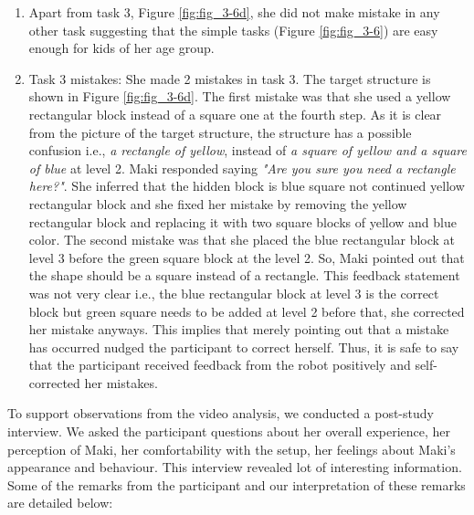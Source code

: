\begin{enumerate}
    \item Apart from task 3, Figure \ref{fig:fig_3-6d}, she did not make mistake in any other task suggesting that the simple tasks (Figure \ref{fig:fig_3-6}) are easy enough for kids of her age group.
    \item Task 3 mistakes: She made 2 mistakes in task 3. The target structure is shown in Figure \ref{fig:fig_3-6d}. The first mistake was that she used a yellow rectangular block instead of a square one at the fourth step. As it is clear from the picture of the target structure, the structure has a possible confusion i.e., \emph{a rectangle of yellow}, instead of \emph{a square of yellow and a square of blue}  at level 2. Maki responded saying \emph{"Are you sure you need a rectangle here?"}. She inferred that the hidden block is blue square not continued yellow rectangular block and she fixed her mistake by removing the yellow rectangular block and replacing it with two square blocks of yellow and blue color. The second mistake was that she placed the blue rectangular block at level 3 before the green square block at the level 2. So, Maki pointed out that the shape should be a square instead of a rectangle. This feedback statement was not very clear i.e., the blue rectangular block at level 3 is the correct block but green square needs to be added at level 2 before that, she corrected her mistake anyways. This implies that merely pointing out that a mistake has occurred nudged the participant to correct herself. Thus, it is safe to say that the participant received feedback from the robot positively and self-corrected her mistakes.
\end{enumerate}
To support observations from the video analysis, we conducted a post-study interview. We asked the participant questions about her overall experience, her perception of Maki, her comfortability with the setup, her feelings about Maki's appearance and behaviour. This interview revealed lot of interesting information. Some of the remarks from the participant and our interpretation of these remarks are detailed below:
